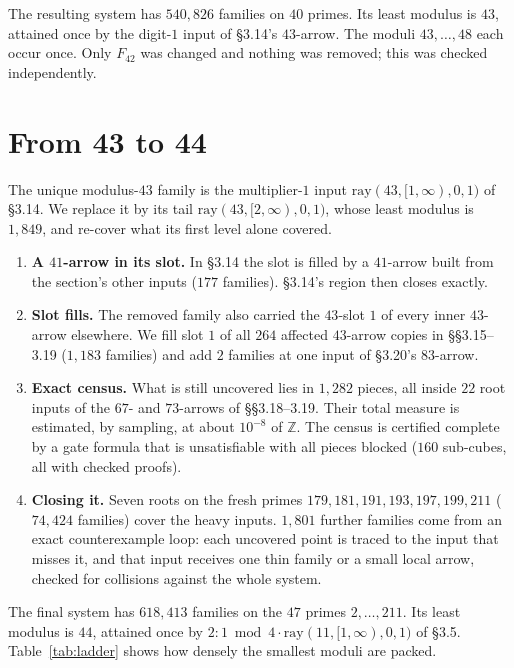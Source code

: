 \documentclass[11pt]{amsart}
\theoremstyle{definition}
\theoremstyle{remark}
\newcommand{\Z}{\mathbb{Z}}
\begin{document}
The resulting system has $540{,}826$ families on $40$ primes. Its least modulus is $43$, attained once by the
digit-$1$ input of §3.14's $43$-arrow. The moduli $43,\dots,48$ each occur once. Only $F_{42}$ was changed and
nothing was removed; this was checked independently.

\section{From 43 to 44}\label{sec:44}

The unique modulus-$43$ family is the multiplier-$1$ input $\mathrm{ray}(43,[1,\infty),0,1)$ of §3.14. We replace it
by its tail $\mathrm{ray}(43,[2,\infty),0,1)$, whose least modulus is $1{,}849$, and re-cover what its first level
alone covered.
\begin{enumerate}
\item \textbf{A $41$-arrow in its slot.} In §3.14 the slot is filled by a $41$-arrow built from the section's other
  inputs ($177$ families). §3.14's region then closes exactly.
\item \textbf{Slot fills.} The removed family also carried the $43$-slot $1$ of every inner $43$-arrow elsewhere. We
  fill slot $1$ of all $264$ affected $43$-arrow copies in §§3.15–3.19 ($1{,}183$ families) and add $2$ families at
  one input of §3.20's $83$-arrow.
\item \textbf{Exact census.} What is still uncovered lies in $1{,}282$ pieces, all inside $22$ root inputs of the
  $67$- and $73$-arrows of §§3.18–3.19. Their total measure is estimated, by sampling, at about $10^{-8}$ of $\Z$. The census is certified
  complete by a gate formula that is unsatisfiable with all pieces blocked ($160$ sub-cubes, all with checked
  proofs).
\item \textbf{Closing it.} Seven roots on the fresh primes $179, 181, 191, 193, 197, 199, 211$ ($74{,}424$ families)
  cover the heavy inputs. $1{,}801$ further families come from an exact counterexample loop: each uncovered point
  is traced to the input that misses it, and that input receives one thin family or a small local arrow, checked for
  collisions against the whole system.
\end{enumerate}

The final system has $618{,}413$ families on the $47$ primes $2,\dots,211$. Its least modulus is $44$, attained
once by $2{:}1 \bmod 4 \cdot \mathrm{ray}(11,[1,\infty),0,1)$ of §3.5. Table~\ref{tab:ladder} shows how densely the
smallest moduli are packed.
\end{document}

